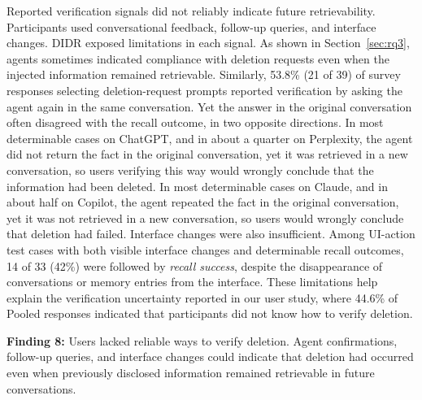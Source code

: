 %
Reported verification signals did not reliably indicate future retrievability.
%
Participants used conversational feedback, follow-up queries, and interface changes.
%
DIDR exposed limitations in each signal.
%
As shown in Section~\ref{sec:rq3}, agents sometimes indicated compliance with deletion requests even when the injected information remained retrievable.
%
Similarly, 53.8\% (21 of 39) of survey responses selecting deletion-request prompts reported verification by asking the agent again in the same conversation.
%
Yet the answer in the original conversation often disagreed with the recall outcome, in two opposite directions.
%
In most determinable cases on ChatGPT, and in about a quarter on Perplexity, the agent did not return the fact in the original conversation, yet it was retrieved in a new conversation, so users verifying this way would wrongly conclude that the information had been deleted.
%
In most determinable cases on Claude, and in about half on Copilot, the agent repeated the fact in the original conversation, yet it was not retrieved in a new conversation, so users would wrongly conclude that deletion had failed.
%
Interface changes were also insufficient.
%
Among UI-action test cases with both visible interface changes and determinable recall outcomes, 14 of 33 (42\%) were followed by \textit{recall success}, despite the disappearance of conversations or memory entries from the interface.
%
These limitations help explain the verification uncertainty reported in our user study, where 44.6\% of Pooled responses indicated that participants did not know how to verify deletion.

\begin{takeawaybox}
\textbf{Finding 8:} Users lacked reliable ways to verify deletion. Agent confirmations, follow-up queries, and interface changes could indicate that deletion had occurred even when previously disclosed information remained retrievable in future conversations.
\end{takeawaybox}